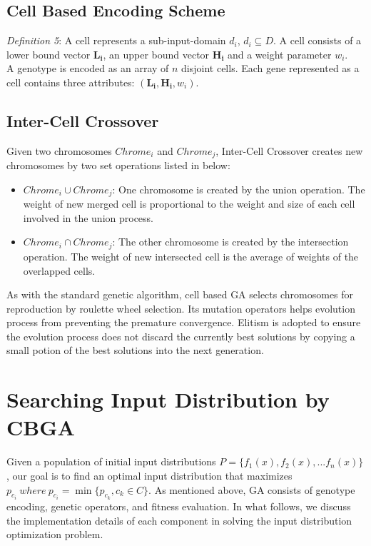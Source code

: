 \documentclass[conference]{IEEEtran}
\renewcommand{\vec}[1]{\mathbf{#1}}
\begin{document}
 \subsection{Cell Based Encoding Scheme}
 \noindent\emph{Definition 5}: A cell represents a sub-input-domain \(d_i\), \(d_i \subseteq D\). A cell consists of a lower bound vector \(\vec{L_i}\), an upper bound vector \(\vec{H_i}\) and a weight parameter \(w_i\).  \\
  
 A genotype is encoded as an array of \(n\) disjoint cells. Each gene represented as a cell contains three attributes: \((\vec{L_i},\vec{H_i},w_i)\). 
 
 
 \subsection{Inter-Cell Crossover}
 Given two chromosomes \(Chrome_i\) and \(Chrome_j\), Inter-Cell Crossover creates new chromosomes by two set operations listed in below:
 \begin{itemize}
 	\item \(Chrome_i \cup Chrome_j\): One chromosome is created by the union operation. The weight of new merged cell is proportional to the weight and size of each cell involved in the union process.
 	\item \(Chrome_i \cap Chrome_j\): The other chromosome is created by the intersection operation. The weight of new intersected cell is the average of weights of the overlapped cells. \\
 \end{itemize}
 
 As with the standard genetic algorithm, cell based GA selects chromosomes for reproduction by roulette wheel selection. Its mutation operators helps evolution process from preventing the premature convergence. Elitism is adopted to ensure the evolution process does not discard the currently best solutions by copying a small potion of the best solutions into the next generation.\\

\section{Searching Input Distribution by CBGA}
Given a population of initial input distributions \(P=\{f_1(x), f_2(x), ... f_n(x)\}\), our goal is to find an optimal input distribution that maximizes \(p_{c_i}\ where\ p_{c_i} = \min\{p_{c_k}, c_k \in C\}\). As mentioned above, GA consists of genotype encoding, genetic operators, and fitness evaluation. In what follows, we discuss the implementation details of each component in solving the input distribution optimization problem.
\end{document}
